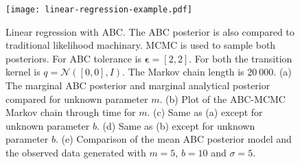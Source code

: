 \begin{figure}[H]
	\centering
	\texttt{[image: linear-regression-example.pdf]}
	\caption{Linear regression with ABC. The ABC posterior is also compared to traditional likelihood machinary. MCMC is used to sample both posteriors. For ABC tolerance is $\bm{\epsilon} = [2,2]$. For both the transition kernel is $q = \mathcal{N}([0,0],I)$. The Markov chain length is $20\ 000$. (a) The marginal ABC posterior and marginal analytical posterior compared for unknown parameter $m$. (b) Plot of the ABC-MCMC Markov chain through time for $m$. (c) Same as (a) except for unknown parameter $b$. (d) Same as (b) except for unknown parameter $b$. (e) Comparison of the mean ABC posterior model and the observed data generated with $m = 5$, $b = 10$ and $\sigma = 5$.}
	\label{linear-regression}
\end{figure}


